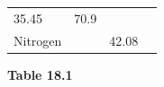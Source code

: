 \begin{enumerate}[noitemsep, label=\textbf{\arabic*}. ]
{{\begin{center}
\begin{xtabular}[t]{|l|l|l|l|}
    
        35.45 &
    
    
        70.9 &
    
    
     \tabularnewline{}
    
    
        Nitrogen &
    
    
         &
    
    
        42.08 &
    
    
     \tabularnewline{}
    \end{xtabular}
      \end{center}
    \begin{center}{\small\bfseries Table 18.1}\end{center}
    
}}
\end{enumerate}
